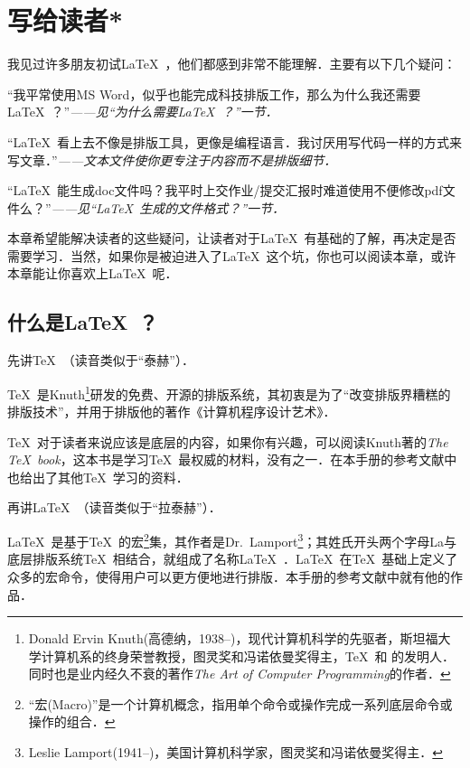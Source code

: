 \chapter{\mbox{写给读者}*}

我见过许多朋友初试\LaTeX\ ，他们都感到非常不能理解．主要有以下几个疑问：
\begin{feae}
\item “我平常使用MS Word，似乎也能完成科技排版工作，那么为什么我还需要\LaTeX\ ？”\hfill \textit{——见“为什么需要\LaTeX\ ？”一节．}
\item “\LaTeX\ 看上去不像是排版工具，更像是编程语言．我讨厌用写代码一样的方式来写文章．”\hfill \textit{——文本文件使你更专注于内容而不是排版细节．}
\item “\LaTeX\ 能生成doc文件吗？我平时上交作业/提交汇报时难道使用不便修改pdf文件么？”\hfill \textit{——见“\LaTeX\ 生成的文件格式？”一节．}
\end{feae}

本章希望能解决读者的这些疑问，让读者对于\LaTeX\ 有基础的了解，再决定是否需要学习．当然，如果你是被迫进入了\LaTeX\ 这个坑，你也可以阅读本章，或许本章能让你喜欢上\LaTeX\ 呢．

\section{什么是\LaTeX\ ？}
先讲\TeX\ （读音类似于“泰赫”）．

\TeX\ 是Knuth\footnote{Donald Ervin Knuth(高德纳，1938--)，现代计算机科学的先驱者，斯坦福大学计算机系的终身荣誉教授，图灵奖和冯诺依曼奖得主，\TeX\ 和  的发明人．同时也是业内经久不衰的著作\emph{The Art of Computer Programming}的作者．}研发的免费、开源的排版系统，其初衷是为了“改变排版界糟糕的排版技术”，并用于排版他的著作《计算机程序设计艺术》．

\TeX\ 对于读者来说应该是底层的内容，如果你有兴趣，可以阅读Knuth著的\emph{The \TeX\ book}，这本书是学习\TeX\ 最权威的材料，没有之一．在本手册的参考文献中也给出了其他\TeX\ 学习的资料．\dpar

再讲\LaTeX\ （读音类似于“拉泰赫”）．

\LaTeX\ 是基于\TeX\ 的宏\footnote{“宏(Macro)”是一个计算机概念，指用单个命令或操作完成一系列底层命令或操作的组合．}集，其作者是Dr.~Lamport\footnote{Leslie Lamport(1941--)，美国计算机科学家，图灵奖和冯诺依曼奖得主．}；其姓氏开头两个字母La与底层排版系统\TeX\ 相结合，就组成了名称\LaTeX\ ．\LaTeX\ 在\TeX\ 基础上定义了众多的宏命令，使得用户可以更方便地进行排版．本手册的参考文献中就有他的作品．

